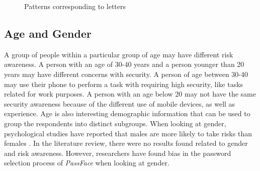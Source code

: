         \begin{figure}[H]
          \centering
          \vspace{0.2cm}
          \vspace{0.2cm}
          \caption{Patterns corresponding to letters}
          \label{fig:letters2}
        \end{figure}

      \clearpage
      \subsection*{Age and Gender} 
      A group of people within a particular group of age may have different risk awareness. A person with an age of 30-40 years and a person younger than 20 years may have different concerns with security. A person of age between 30-40 may use their phone to perform a task with requiring high security, like tasks related for work purposes. A person with an age below 20 may not have the same security awareness because of the different use of mobile devices, as well as experience. Age is also interesting demographic information that can be used to group the respondents into distinct subgroups. When looking at gender, psychological studies have reported that males are more likely to take risks than females \cite{Byrnes}. In the literature review, there were no results found related to gender and risk awareness. However, researchers have found bias in the password selection process of {\it PassFace} when looking at gender.


